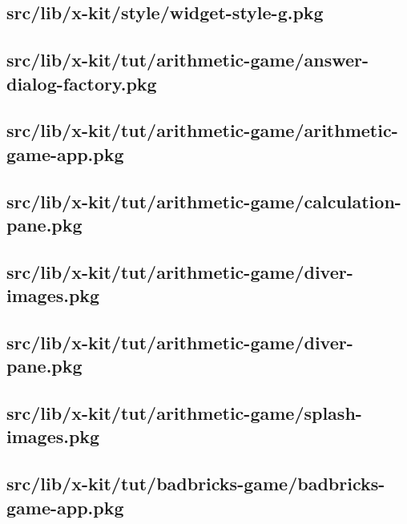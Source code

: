 \subsection{src/lib/x-kit/style/widget-style-g.pkg}


\subsection{src/lib/x-kit/tut/arithmetic-game/answer-dialog-factory.pkg}


\subsection{src/lib/x-kit/tut/arithmetic-game/arithmetic-game-app.pkg}


\subsection{src/lib/x-kit/tut/arithmetic-game/calculation-pane.pkg}


\subsection{src/lib/x-kit/tut/arithmetic-game/diver-images.pkg}


\subsection{src/lib/x-kit/tut/arithmetic-game/diver-pane.pkg}


\subsection{src/lib/x-kit/tut/arithmetic-game/splash-images.pkg}


\subsection{src/lib/x-kit/tut/badbricks-game/badbricks-game-app.pkg}


